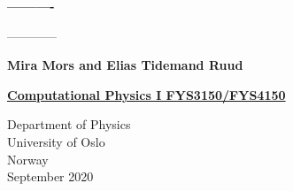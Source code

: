 \begin{titlepage}
   \begin{center}
       \vspace*{1cm}
       \Huge\textbf{----------}
\end{center}
\begin{center}

       \vspace{0.5cm}
       \large
        ------------
            
       \vspace{1.5cm}

       \textbf{Mira Mors and Elias Tidemand Ruud}

       \vfill

 
            
      {\bf \href{{http://www.uio.no/studier/emner/matnat/fys/FYS3150/index-eng.html}}{Computational Physics I FYS3150/FYS4150}} 
            
       \vspace{0.8cm}
     
            
       Department of Physics\\
       University of Oslo\\
       Norway\\
       September 2020
            
   \end{center}
\end{titlepage}




